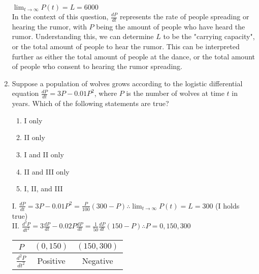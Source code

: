 \documentclass[10pt,letterpaper]{report}
\begin{document}
\begin{enumerate}
  $\lim_{t\to\infty}P(t)=L=6000$ \\
  
  In the context of this question, $\frac{dP}{dt}$ represents the rate of people spreading or hearing the rumor, with $P$ being the amount of people who have heard the rumor. Understanding this, we can determine $L$ to be the "carrying capacity", or the total amount of people to hear the rumor. This can be interpreted further as either the total amount of people at the dance, or the total amount of people who consent to hearing the rumor spreading. \\
  
  \hline
  
  \item{Suppose a population of wolves grows according to the logistic differential equation $\frac{dP}{dt}=3P-0.01P^{2}$, where $P$ is the number of wolves at time $t$ in years. Which of the following statements are true? }
    \begin{enumerate}
      \begin{enumerate}
        \item{$\lim_{t\to\infty}P(t)=300$}
        \item{The growth rate of the wolf population is greatest at $P=150$.}
        \item{If $P>300$, the population of wolves is increasing.}
      \end{enumerate}
      \item{I only}
      \item{II only}
      \item{I and II only}
      \item{II and III only}
      \item{I, II, and III} \\
    \end{enumerate}
  
    I. $\frac{dP}{dt}=3P-0.01P^{2}=\frac{P}{100}\left(300-P\right)\therefore \lim_{t\to\infty}P(t)=L=300$ (I holds true) \\
    
    II. $\frac{d^{2}P}{dt^{2}}=3\frac{dP}{dt}-0.02P\frac{dP}{dt}=\frac{1}{50}\frac{dP}{dt}\left(150-P\right)\therefore P=0, 150, 300$ \\
    
    \begin{center}
      \begin{tabular}{| c | c | c |}
        \hline
        $P$ & $(0, 150)$ & $(150, 300)$ \\
        \hline
        $\frac{d^{2}P}{dt^{2}}$ & Positive & Negative \\
        \hline
      \end{tabular}
    \end{center}
    

\end{enumerate}
\end{document}
